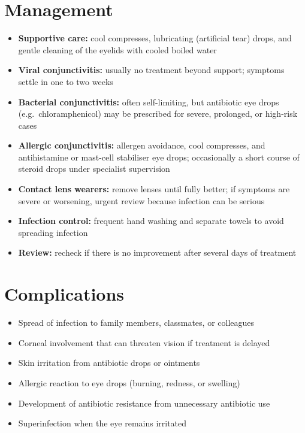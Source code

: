 \section*{Management}
\begin{itemize}
    \item \textbf{Supportive care:} cool compresses, lubricating (artificial tear) drops, and gentle cleaning of the eyelids with cooled boiled water
    \item \textbf{Viral conjunctivitis:} usually no treatment beyond support; symptoms settle in one to two weeks
    \item \textbf{Bacterial conjunctivitis:} often self-limiting, but antibiotic eye drops (e.g.\ chloramphenicol) may be prescribed for severe, prolonged, or high-risk cases
    \item \textbf{Allergic conjunctivitis:} allergen avoidance, cool compresses, and antihistamine or mast-cell stabiliser eye drops; occasionally a short course of steroid drops under specialist supervision
    \item \textbf{Contact lens wearers:} remove lenses until fully better; if symptoms are severe or worsening, urgent review because infection can be serious
    \item \textbf{Infection control:} frequent hand washing and separate towels to avoid spreading infection
    \item \textbf{Review:} recheck if there is no improvement after several days of treatment
\end{itemize}

\section*{Complications}
\begin{itemize}
    \item Spread of infection to family members, classmates, or colleagues
    \item Corneal involvement that can threaten vision if treatment is delayed
    \item Skin irritation from antibiotic drops or ointments
    \item Allergic reaction to eye drops (burning, redness, or swelling)
    \item Development of antibiotic resistance from unnecessary antibiotic use
    \item Superinfection when the eye remains irritated
\end{itemize}

